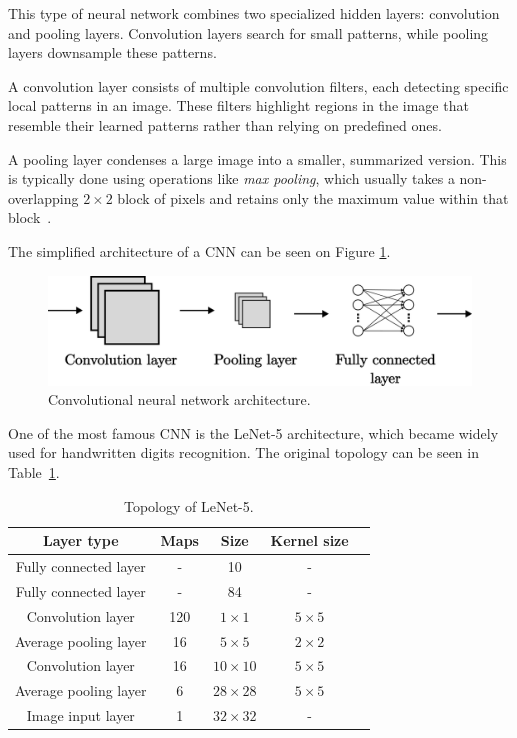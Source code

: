 \documentclass[a4paper,oneside,onecolumn,12pt]{book}
\begin{document}
		This type of neural network combines two specialized hidden layers: convolution and pooling layers. Convolution layers search for small patterns, while pooling layers downsample these patterns.

		A convolution layer consists of multiple convolution filters, each detecting specific local patterns in an image. These filters highlight regions in the image that resemble their learned patterns rather than relying on predefined ones.

		A pooling layer condenses a large image into a smaller, summarized version. This is typically done using operations like \textit{max pooling}, which usually takes a non-overlapping $2 \times 2$ block of pixels and retains only the maximum value within that block~\cite{AISL}.

		The simplified architecture of a CNN can be seen on Figure \ref{fig:cnn}.
		\begin{figure}[H]
		\begin{center}
			\includegraphics[keepaspectratio,width=14cm]{kep/cnn.png}
			\caption{Convolutional neural network architecture.}
			\label{fig:cnn}
		\end{center}
		\end{figure}
		
		One of the most famous CNN is the LeNet-5 architecture, which became widely used for handwritten digits recognition. The original topology can be seen in Table~\ref{table:lenet_topology}.
		\begin{table}[H]
		\begin{center}
		\begin{tabular}{|c|c|c|c|c|}
		\hline
		\textbf{Layer type} & \textbf{Maps} & \textbf{Size} & \textbf{Kernel size} \\
		\hline
		Fully connected layer & - & 10 & - \\ 
		\hline
		Fully connected layer & - & 84 & - \\ 
		\hline
		Convolution layer & 120 & $1 \times 1$ & $5 \times 5$ \\ 
		\hline
		Average pooling layer & 16 & $5 \times 5$ & $2 \times 2$ \\
		\hline
		Convolution layer & 16 & $10 \times 10$ & $5 \times 5$ \\
		\hline
		Average pooling layer & 6 & $28 \times 28$ & $5 \times 5$ \\
		\hline
		Image input layer & 1 & $32 \times 32$ & - \\
		\hline
		\end{tabular}
		\end{center}
		\caption{Topology of LeNet-5.}
		\label{table:lenet_topology}
		\end{table}
		
\end{document}
